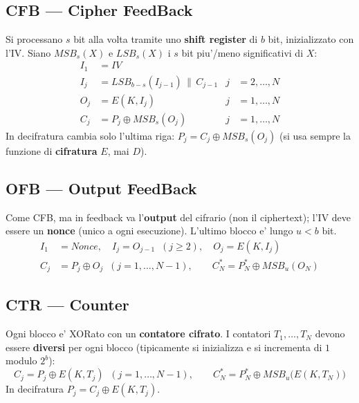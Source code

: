 \subsection{CFB — Cipher FeedBack}
Si processano $ s $ bit alla volta tramite uno \textbf{shift register} di $ b $ bit, inizializzato con l'IV. Siano $ MSB_s(X) $ e $ LSB_s(X) $ i $ s $ bit piu'/meno significativi di $ X $:
\[
  \begin{aligned}
    I_1 &= IV \\
    I_j &= LSB_{b-s}(I_{j-1}) \,\|\, C_{j-1} & j &= 2, \dots, N \\
    O_j &= E(K, I_j) & j &= 1, \dots, N \\
    C_j &= P_j \oplus MSB_s(O_j) & j &= 1, \dots, N
  \end{aligned}
\]
In decifratura cambia solo l'ultima riga: $ P_j = C_j \oplus MSB_s(O_j) $ (si usa sempre la funzione di \textbf{cifratura} $ E $, mai $ D $).

\subsection{OFB — Output FeedBack}
Come CFB, ma in feedback va l'\textbf{output} del cifrario (non il ciphertext); l'IV deve essere un \textbf{nonce} (unico a ogni esecuzione). L'ultimo blocco e' lungo $ u < b $ bit.
\[
  \begin{aligned}
    I_1 &= Nonce, \quad I_j = O_{j-1} \;\; (j \ge 2), \quad O_j = E(K, I_j) \\
    C_j &= P_j \oplus O_j \;\; (j = 1, \dots, N-1), \qquad C_N^* = P_N^* \oplus MSB_u(O_N)
  \end{aligned}
\]

\subsection{CTR — Counter}
Ogni blocco e' XORato con un \textbf{contatore cifrato}. I contatori $ T_1, \dots, T_N $ devono essere \textbf{diversi} per ogni blocco (tipicamente si inizializza e si incrementa di $ 1 $ modulo $ 2^b $):
\[
  C_j = P_j \oplus E(K, T_j) \;\; (j = 1, \dots, N-1), \qquad C_N^* = P_N^* \oplus MSB_u\big(E(K, T_N)\big)
\]
In decifratura $ P_j = C_j \oplus E(K, T_j) $.

